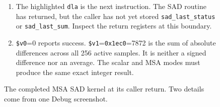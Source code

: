\begin{figure}[htbp]
  \par\smallskip
  \begin{minipage}{\linewidth}
    \small
    \begin{enumerate}
      \item The highlighted \texttt{dla} is the next instruction. The SAD routine has returned, but the caller has not yet stored \texttt{sad\_last\_status} or \texttt{sad\_last\_sum}. Inspect the return registers at this boundary.
      \item \texttt{\$v0}=0 reports success. \texttt{\$v1}=\texttt{0x1ec0}=7872 is the sum of absolute differences across all 256 active samples. It is neither a signed difference nor an average. The scalar and MSA modes must produce the same exact integer result.
    \end{enumerate}
  \end{minipage}
  \caption{The completed MSA SAD kernel at its caller return. Two details come from one Debug screenshot.}
  \label{fig:h263-sad-result}
\end{figure}
